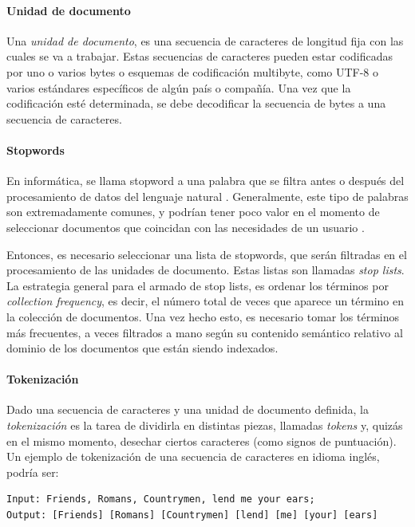 \paragraph{Unidad de documento}
Una \textit{unidad de documento}, es una secuencia de caracteres de longitud fija con las cuales se va a trabajar. Estas secuencias de caracteres pueden estar codificadas por uno o varios bytes o esquemas de codificación multibyte, como UTF-8 o varios estándares específicos de algún país o compañía. Una vez que la codificación esté determinada, se debe decodificar la secuencia de bytes a una secuencia de caracteres.

\paragraph{Stopwords}
En informática, se llama stopword a una palabra que se filtra antes o después del procesamiento de datos del lenguaje natural \citep{leskovec2014mining}. Generalmente, este tipo de palabras son extremadamente comunes, y podrían tener poco valor en el momento de seleccionar documentos que coincidan con las necesidades de un usuario \citep{schutze2008introduction}.

\bigskip Entonces, es necesario seleccionar una lista de stopwords, que serán filtradas en el procesamiento de las unidades de documento. Estas listas son llamadas \textit{stop lists}. La estrategia general para el armado de stop lists, es ordenar los términos por \textit{collection frequency}, es decir, el número total de veces que aparece un término en la colección de documentos. Una vez hecho esto, es necesario tomar los términos más frecuentes, a veces filtrados a mano según su contenido semántico relativo al dominio de los documentos que están siendo indexados.

\paragraph{Tokenización}
Dado una secuencia de caracteres y una unidad de documento definida, la \textit{tokenización} es la tarea de dividirla en distintas piezas, llamadas \textit{tokens} y, quizás en el mismo momento, desechar ciertos caracteres (como signos de puntuación). Un ejemplo de tokenización de una secuencia de caracteres en idioma inglés, podría ser:

\begin{verbatim}
Input: Friends, Romans, Countrymen, lend me your ears;
Output: [Friends] [Romans] [Countrymen] [lend] [me] [your] [ears]
\end{verbatim}

